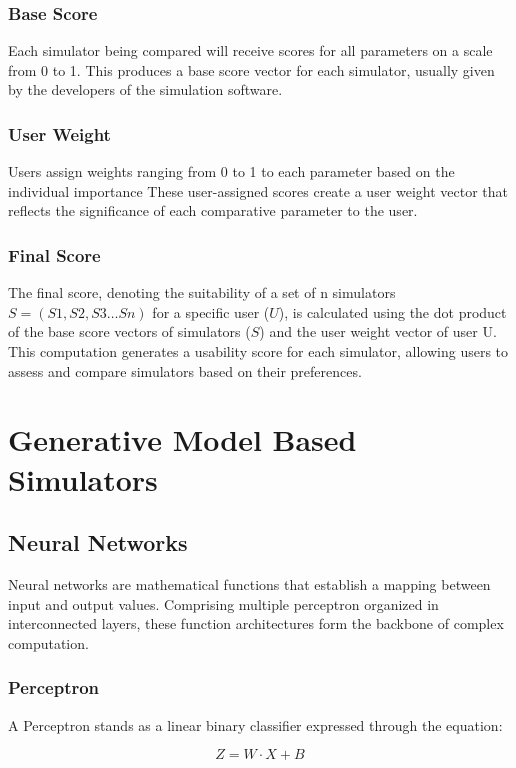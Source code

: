 \documentclass[12pt,twoside,a4paper,parskip]{scrbook} %
\begin{document}
\subsection{Base Score}
Each simulator being compared will receive scores for all parameters on a scale from 0 to 1. This produces a base score vector for each simulator, usually given by the developers of the simulation software.

\subsection{User Weight}
Users assign weights ranging from 0 to 1 to each parameter based on the individual importance These user-assigned scores create a user weight vector that reflects the significance of each comparative parameter to the user.

\subsection{Final Score}
The final score, denoting the suitability of a set of n simulators $S = (S1, S2, S3… Sn)$ for a specific user ($U$), is calculated using the dot product of the base score vectors of simulators ($S$) and the user weight vector of user U. This computation generates a usability score for each simulator, allowing users to assess and compare simulators based on their preferences.

\chapter{Generative Model Based Simulators}
\section{Neural Networks}
Neural networks are mathematical functions that establish a mapping between input and output values. Comprising multiple perceptron organized in interconnected layers, these function architectures form the backbone of complex computation.

\subsection{Perceptron}
A Perceptron stands as a linear binary classifier expressed through the equation:

\[Z = W \cdot X + B\]
\end{document}
